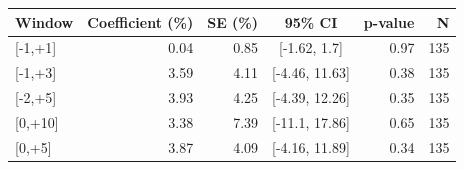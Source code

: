 \begin{tabular}{lrrcrr}
  \toprule
Window & Coefficient (\%) & SE (\%) & 95\% CI & p-value & N \\
  \midrule
{[}-1,+1] & 0.04 & 0.85 & {[}-1.62, 1.7] & 0.97 & 135 \\
  {[}-1,+3] & 3.59 & 4.11 & {[}-4.46, 11.63] & 0.38 & 135 \\
  {[}-2,+5] & 3.93 & 4.25 & {[}-4.39, 12.26] & 0.35 & 135 \\
  {[}0,+10] & 3.38 & 7.39 & {[}-11.1, 17.86] & 0.65 & 135 \\
  {[}0,+5] & 3.87 & 4.09 & {[}-4.16, 11.89] & 0.34 & 135 \\
   \bottomrule
\end{tabular}

